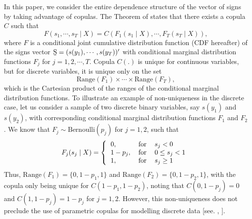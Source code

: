 \documentclass[harvard,11pt]{article}
\begin{document}
In this paper, we consider the entire dependence structure of the vector of signs by taking advantage of copulas. The Theorem of  \citet{sklar1959fonctions} states that there exists a copula $C$ such that
\begin{equation}
F(s_1,\cdots,s_T\mid X)=C(F_1(s_1\mid X),\cdots,F_T(s_T\mid X)),
\end{equation}
where $F$ is a conditional joint cumulative distribution function (CDF hereafter) of the signs vector $\text{\b{S}}=(s(y_1),\cdots,s(y_T))'$ with conditional marginal distribution functions $F_j$ for $j=1,2,\cdots,T$. Copula $C(.)$ is unique for continuous variables, but for discrete variables, it is unique only on the set
\[
\text{Range}(F_1)\times\cdots\times\text{Range}(F_T),
\]
which is the Cartesian product of the ranges of the conditional marginal distribution functions. To illustrate an example of non-uniqueness in the discrete case, let us consider a sample of two discrete binary variables, say $s(y_1)$ and $s(y_2)$, with corresponding conditional marginal distribution functions $F_1$ and $F_2$. We know that $F_j\sim\text{Bernoulli}(p_j)$ for $j=1,2$, such that
\begin{equation}\label{eq: BernoulliCDF}
F_j(s_j\mid X)=\left\{ 
\begin{tabular}{lll}
$0,$ &$\text{for}$& $s_j< 0$ \\ 
$1-p_j,$ &$\text{for}$ &$0\leq s_j< 1$ \\
$1,$& $\text{for}$& $s_j\geq 1$
\end{tabular}%
\right.
\end{equation} 
Thus, $\text{Range}(F_1)=\{0,1-p_1,1\}$ and $\text{Range}(F_2)=\{0,1-p_2,1\}$, with the copula only being unique for $C(1-p_1,1-p_2)$, noting that $C(0,1-p_j)=0$ and $C(1,1-p_j)=1-p_j$ for $j=1,2$. However, this non-uniqueness does not preclude the use of parametric copulas for modelling discrete data [see. \citet{joe1997multivariate}, \citet{song2009joint}]. 
\end{document}
